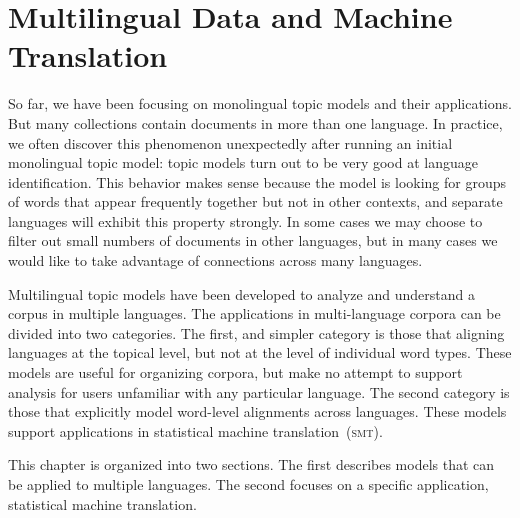 \chapter{Multilingual Data and Machine Translation}
\label{ch:mt}

So far, we have been focusing on monolingual topic models and their applications.
But many collections contain documents in more than one language.
In practice, we often discover this phenomenon unexpectedly after running an initial monolingual topic model: topic models turn out to be very good at language identification.
This behavior makes sense because the model is looking for groups of words that appear frequently together but not in other contexts, and separate languages will exhibit this property strongly.
In some cases we may choose to filter out small numbers of documents in other languages, but in many cases we would like to take advantage of  connections across many languages.

Multilingual topic models have been developed to analyze and understand a corpus in multiple languages.
The applications in multi-language corpora can be divided into two categories.
The first, and simpler category is those that aligning languages at the topical level, but not at the level of individual word types.
These models are useful for organizing corpora, but make no attempt to support analysis for users unfamiliar with any particular language.
The second category is those that explicitly model word-level alignments across languages.
These models support applications in statistical machine translation~(\textsc{smt}).

This chapter is organized into two sections. The first describes models that can be applied to multiple languages. The second focuses on a specific application, statistical machine translation.

